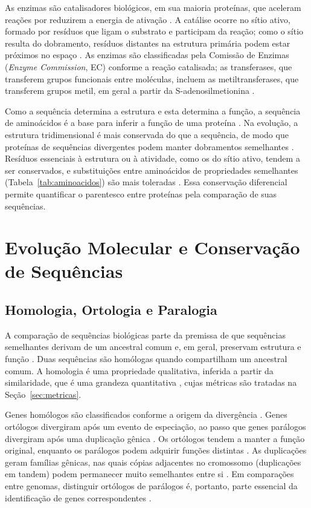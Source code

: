 As enzimas são catalisadores biológicos, em sua maioria proteínas, que aceleram reações por reduzirem a energia de ativação \cite{Nelson2014}. A catálise ocorre no sítio ativo, formado por resíduos que ligam o substrato e participam da reação; como o sítio resulta do dobramento, resíduos distantes na estrutura primária podem estar próximos no espaço \cite{Nelson2014}. As enzimas são classificadas pela Comissão de Enzimas (\textit{Enzyme Commission}, EC) conforme a reação catalisada; as transferases, que transferem grupos funcionais entre moléculas, incluem as metiltransferases, que transferem grupos metil, em geral a partir da S-adenosilmetionina \cite{Nelson2014}.

Como a sequência determina a estrutura e esta determina a função, a sequência de aminoácidos é a base para inferir a função de uma proteína \cite{Nelson2014}. Na evolução, a estrutura tridimensional é mais conservada do que a sequência, de modo que proteínas de sequências divergentes podem manter dobramentos semelhantes \cite{Chothia1986}. Resíduos essenciais à estrutura ou à atividade, como os do sítio ativo, tendem a ser conservados, e substituições entre aminoácidos de propriedades semelhantes (Tabela~\ref{tab:aminoacidos}) são mais toleradas \cite{Nelson2014}. Essa conservação diferencial permite quantificar o parentesco entre proteínas pela comparação de suas sequências.

\section{Evolução Molecular e Conservação de Sequências}
\label{sec:evolucao}

\subsection{Homologia, Ortologia e Paralogia}

A comparação de sequências biológicas parte da premissa de que sequências semelhantes derivam de um ancestral comum e, em geral, preservam estrutura e função \cite{Durbin1998}. Duas sequências são homólogas quando compartilham um ancestral comum. A homologia é uma propriedade qualitativa, inferida a partir da similaridade, que é uma grandeza quantitativa \cite{Pearson2013}, cujas métricas são tratadas na Seção~\ref{sec:metricas}.

Genes homólogos são classificados conforme a origem da divergência \cite{Fitch1970}. Genes ortólogos divergiram após um evento de especiação, ao passo que genes parálogos divergiram após uma duplicação gênica \cite{Fitch1970}. Os ortólogos tendem a manter a função original, enquanto os parálogos podem adquirir funções distintas \cite{Koonin2005}. As duplicações geram famílias gênicas, nas quais cópias adjacentes no cromossomo (duplicações em tandem) podem permanecer muito semelhantes entre si \cite{Alberts2017}. Em comparações entre genomas, distinguir ortólogos de parálogos é, portanto, parte essencial da identificação de genes correspondentes \cite{Koonin2005}.


